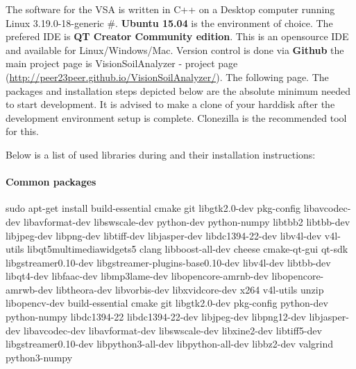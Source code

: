The software for the VSA is written in C++ on a Desktop computer running Linux 3.19.0-18-generic \#. \textbf{Ubuntu 15.04} is the environment of choice. The prefered IDE is \textbf{QT Creator Community edition}. This is an opensource IDE and available for Linux/Windows/Mac. Version control is done via \textbf{Github} the main project page is VisionSoilAnalyzer - project page (\url{http://peer23peer.github.io/VisionSoilAnalyzer/}). The following page. The packages and installation steps depicted below are the absolute minimum needed to start development. It is advised to make a clone of your harddisk after the development environment setup is complete. Clonezilla is the recommended tool for this.

Below is a list of used libraries during and their installation instructions:

\paragraph{Common packages}
\begin{sBox}
	sudo apt-get install build-essential cmake git libgtk2.0-dev pkg-config libavcodec-dev libavformat-dev libswscale-dev python-dev python-numpy libtbb2 libtbb-dev libjpeg-dev libpng-dev libtiff-dev libjasper-dev libdc1394-22-dev libv4l-dev v4l-utils libqt5multimediawidgets5 clang libboost-all-dev cheese cmake-qt-gui qt-sdk libgstreamer0.10-dev libgstreamer-plugins-base0.10-dev libv4l-dev libtbb-dev libqt4-dev libfaac-dev libmp3lame-dev libopencore-amrnb-dev libopencore-amrwb-dev libtheora-dev libvorbis-dev libxvidcore-dev x264 v4l-utils unzip libopencv-dev build-essential cmake git libgtk2.0-dev pkg-config python-dev python-numpy libdc1394-22 libdc1394-22-dev libjpeg-dev libpng12-dev libjasper-dev libavcodec-dev libavformat-dev libswscale-dev libxine2-dev libtiff5-dev libgstreamer0.10-dev libpython3-all-dev libpython-all-dev libbz2-dev valgrind python3-numpy
\end{sBox}

